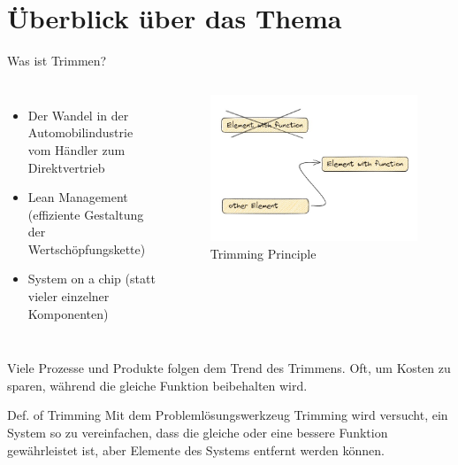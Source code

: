 \documentclass{beamer}
\title{Problem Solving Tools - Trimming
	\vskip1em}
\subtitle{Modul Systemmodellierung und Semantisches Web}
\author{Carsten Lehmann}
\date{21. Juni 2022}
\begin{document}
	\begin{frame}[plain]
		\maketitle
	\end{frame}

	\section{Überblick über das Thema}
	
	\begin{frame}{Was ist Trimmen?}
		\begin{columns}
			\begin{itemize}
				\item Der Wandel in der Automobilindustrie vom Händler zum Direktvertrieb
				\item Lean Management (effiziente Gestaltung der Wertschöpfungskette)
				\item System on a chip (statt vieler einzelner Komponenten)
			\end{itemize}
			\begin{figure}
				\centering
			\includegraphics[width=.7\textwidth]{img/Intro.jpg}
				\caption{Trimming Principle}
			\end{figure}	
		\end{columns}
		Viele Prozesse und Produkte folgen dem Trend des Trimmens. Oft, um Kosten zu sparen, während die gleiche Funktion beibehalten wird.
	\end{frame}
	
	\begin{frame}{Def. of Trimming}
		Mit dem Problemlösungswerkzeug Trimming wird versucht, ein System so zu vereinfachen, dass die gleiche oder eine bessere Funktion gewährleistet ist, aber Elemente des Systems entfernt werden können.
	\end{frame}
	
\end{document}
